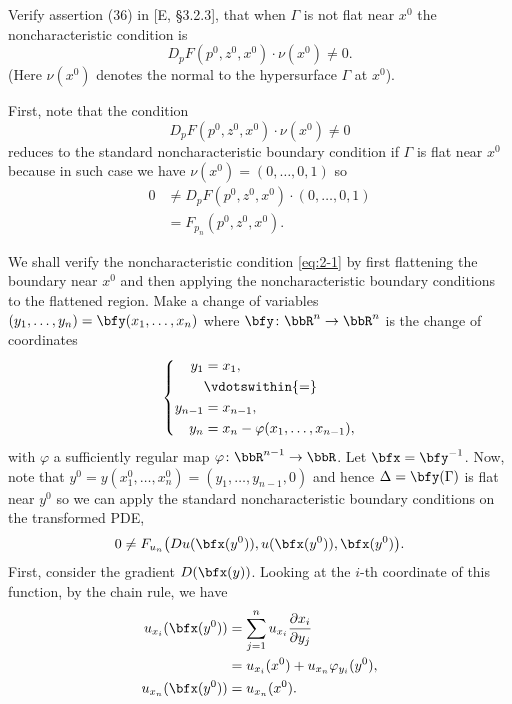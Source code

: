 \begin{problem}
  Verify assertion (36) in [E, \S 3.2.3], that when \(\Gamma\) is not flat
  near \(x^0\) the noncharacteristic condition is
  \[
    D_pF(p^0,z^0,x^0)\cdot \nu(x^0)\neq 0.
  \]
  (Here \(\nu(x^0)\) denotes the normal to the hypersurface \(\Gamma\) at
  \(x^0\)).
\end{problem}
\begin{solution}
  First, note that the condition
  \begin{equation}
    \label{eq:2-1}
    D_pF(p^0,z^0,x^0)\cdot \nu(x^0)\neq 0
  \end{equation}
  reduces to the standard noncharacteristic boundary condition if
  \(\Gamma\) is flat near \(x^0\) because in such case we have
  \(\nu(x^0)=(0,\dotsc,0,1)\) so
  \begin{align*}
    0&\neq D_pF(p^0,z^0,x^0)\cdot (0,\dotsc,0,1)\\
     &=F_{p_n}(p^0,z^0,x^0).
  \end{align*}

  We shall verify the noncharacteristic condition \eqref{eq:2-1} by first
  flattening the boundary near \(x^0\) and then applying the
  noncharacteristic boundary conditions to the flattened region. Make a
  change of variables \((y_1,\dotsc,y_n)=\bfy(x_1,\dotsc,x_n)\) where
  \(\bfy\colon\bbR^n\to\bbR^n\) is the change of coordinates
  \[
    \left\{
      \begin{aligned}
        y_1&=x_1,\\
        &\vdotswithin{=}\\
        y_{n-1}&=x_{n-1},\\
        y_n&=x_n-\varphi(x_1,\dotsc,x_{n-1}),
      \end{aligned}
    \right.
  \]
  with \(\varphi\) a sufficiently regular map
  \(\varphi\colon\bbR^{n-1}\to\bbR\). Let \(\bfx=\bfy^{-1}\). Now, note
  that \(y^0=y(x_1^0,\dotsc,x_n^0)=(y_1,\dotsc,y_{n-1},0)\) and hence
  \(\Delta=\bfy(\Gamma)\) is flat near \(y^0\) so we can apply the standard
  noncharacteristic boundary conditions on the transformed PDE,
  \[
    0\neq F_{u_n}\bigl(Du(\bfx(y^0)),u(\bfx(y^0)),\bfx(y^0)\bigr).
  \]
  First, consider the gradient \(D(\bfx(y))\). Looking at the \(i\)-th
  coordinate of this function, by the chain rule, we have
  \begin{align*}
    u_{x_i}(\bfx(y^0))
    &=\sum_{j=1}^n u_{x_i}\frac{\partial x_i}{\partial y_j}\\
    &=u_{x_i}(x^0)+u_{x_n}\varphi_{y_i}(y^0),\\
    u_{x_n}(\bfx(y^0))
    &=u_{x_n}(x^0).
  \end{align*}
\end{solution}
\newpage

